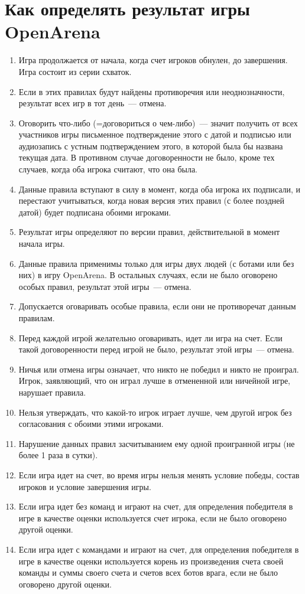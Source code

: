 \documentclass[a4paper,titlepage,12pt]{article}
\begin{document}
{\center\section*{Как определять результат игры OpenArena}}

\thispagestyle{empty}

\begin{enumerate}
\item Игра продолжается от начала, когда счет игроков обнулен,
    до завершения.
    Игра состоит из серии схваток.
\item Если в этих правилах будут найдены противоречия или неоднозначности,
    результат всех игр в тот день~--- отмена.
\item Оговорить что-либо (=договориться о чем-либо)~---
    значит получить от всех участников игры
    письменное подтверждение этого с датой и подписью
    или аудиозапись с устным подтверждением этого,
    в которой была бы названа текущая дата.
    В противном случае договоренности не было,
    кроме тех случаев, когда оба игрока считают, что она была.
\item Данные правила вступают в силу в момент, когда оба игрока
    их подписали, и перестают учитываться, когда новая версия этих правил
    (с более поздней датой) будет подписана обоими игроками.
\item Результат игры определяют по версии правил, действительной в момент
    начала игры.
\item Данные правила применимы только для игры двух людей
    (с ботами или без них) в игру OpenArena.
    В остальных случаях, если не было оговорено особых правил,
    результат этой игры~--- отмена.
\item Допускается оговаривать особые правила, если они не противоречат
    данным правилам.
\item Перед каждой игрой желательно оговаривать, идет ли игра на счет.
    Если такой договоренности перед игрой не было,
    результат этой игры~--- отмена.
\item Ничья или отмена игры означает, что никто не победил и никто не проиграл.
    Игрок, заявляющий, что он играл лучше в отмененной или ничейной игре,
    нарушает правила.
\item Нельзя утверждать, что какой-то игрок играет лучше, чем другой игрок
    без согласования с обоими этими игроками.
\item Нарушение данных правил засчитыванием ему одной проигранной игры
    (не более 1 раза в сутки).
\item Если игра идет на счет, во время игры нельзя менять условие победы,
    состав игроков и условие завершения игры.
\item Если игра идет без команд и играют на счет, для определения
    победителя в игре в качестве оценки используется счет игрока,
    если не было оговорено другой оценки.
\item Если игра идет с командами и играют на счет, для определения
    победителя в игре в качестве оценки используется корень из
    произведения счета своей команды и суммы своего счета и счетов
    всех ботов врага, если не было оговорено другой оценки.


\end{enumerate}
\end{document}
